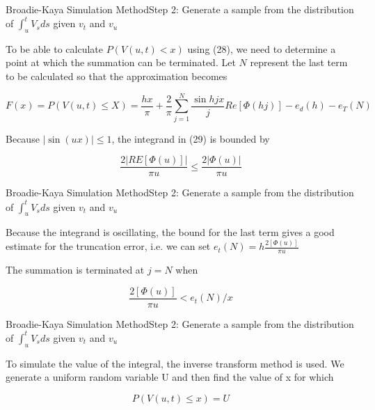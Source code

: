 \begin{frame}{Broadie-Kaya Simulation Method}{Step 2:  Generate a sample from the distribution of $\int_{u}^t V_s ds$ given $v_t$ and $v_u$}


    To be able to calculate $P(V(u, t) < x )$ using (28), we
    need to determine a point at which the summation can be
    terminated. Let $N$ represent the last term to be calculated
    so that the approximation becomes

     \begin{equation}
        F(x) = P(V(u, t) \leq X) = \frac{hx}{\pi} + \frac{2}{\pi} \sum_{j=1}^N \frac{\sin hjx}{j} Re[\Phi(hj)] - e_d(h) - e_T(N)
    \end{equation}

    Because $|\sin(ux)| \leq 1$, the integrand in (29) is bounded by
     
    \begin{equation}
        \frac{2|RE[\Phi(u)]|}{\pi u} \leq \frac{2|\Phi(u)|}{\pi u}
    \end{equation}

    

\end{frame}

\begin{frame}{Broadie-Kaya Simulation Method}{Step 2:  Generate a sample from the distribution of $\int_{u}^t V_s ds$ given $v_t$ and $v_u$}
    
    Because the integrand is oscillating, the bound for the last term gives a good estimate for the truncation error, i.e. we can set $e_t(N) = h \frac{2[\Phi(u)]}{\pi u} $ 
    
    The summation is terminated at $j = N$ when

    \begin{equation}
        \frac{2[\Phi(u)]}{\pi u} < e_t(N)/x
     \end{equation}
    
\end{frame}



\begin{frame}{Broadie-Kaya Simulation Method}{Step 2:  Generate a sample from the distribution of $\int_{u}^t V_s ds$ given $v_t$ and $v_u$}

    
    To simulate the value of the integral, the inverse transform method is used. We generate a uniform random variable U and then find the value of x for which 

    \begin{equation}
        P(V(u, t) \leq x) = U
    \end{equation}

\end{frame}


